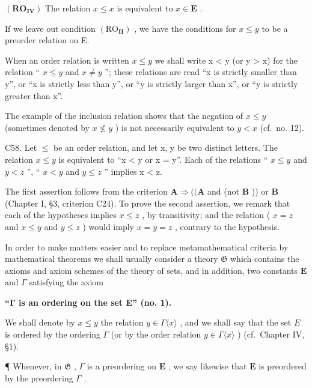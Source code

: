 \((\mathbf{RO}_{\mathbf{IV}})\) The relation \(x \leqslant x\) is equivalent to \(x \in \mathbf{E}\) .

If we leave out condition \((\mathrm{RO}_{\mathbf{II}})\) , we have the conditions for \(x \leqslant y\) to be a preorder relation on E.

When an order relation is written \(x \leqslant y\) we shall write x \textless{} y (or y \textgreater{} x) for the relation `` \(x \leqslant y\) and \(x \neq y\) ''; these relations are read ``x is strictly smaller than y'', or ``x is strictly less than y'', or ``y is strictly larger than x'', or ``y is strictly greater than x''.

The example of the inclusion relation shows that the negation of \(x \leqslant y\) (sometimes denoted by \(x \nleqslant y\) ) is not necessarily equivalent to \(y < x\) (cf.~no. 12).

C58. Let \(\leqslant\) be an order relation, and let x, y be two distinct letters. The relation \(x \leqslant y\) is equivalent to ``x \textless{} y or x = y''. Each of the relations `` \(x \leqslant y\) and \(y < z\) '', `` \(x < y\) and \(y \leqslant z\) '' implies x \textless{} z.

The first assertion follows from the criterion \(\mathbf{A} \Longrightarrow ((\mathbf{A}\) and (not \(\mathbf{B}\) )) or \(\mathbf{B}\) (Chapter I, §3, criterion C24). To prove the second assertion, we remark that each of the hypotheses implies \(x \leqslant z\) , by transitivity; and the relation ( \(x = z\) and \(x \leqslant y\) and \(y \leqslant z\) ) would imply \(x = y = z\) , contrary to the hypothesis.

In order to make matters easier and to replace metamathematical criteria by mathematical theorems we shall usually consider a theory \(\mathfrak{G}\) which contains the axioms and axiom schemes of the theory of sets, and in addition, two constants \(\mathbf{E}\) and \(\Gamma\) satisfying the axiom

\textbf{``Γ is an ordering on the set E'' (no. 1).}

We shall denote by \(x \leqslant y\) the relation \(y \in \Gamma \langle x \rangle\) , and we shall say that the set \(E\) is ordered by the ordering \(\Gamma\) (or by the order relation \(y \in \Gamma \langle x \rangle\) ) (cf.~Chapter IV, §1).

¶ Whenever, in \(\mathfrak{G}\) , \(\Gamma\) is a preordering on \(\mathbf{E}\) , we say likewise that \(\mathbf{E}\) is preordered by the preordering \(\Gamma\) .

